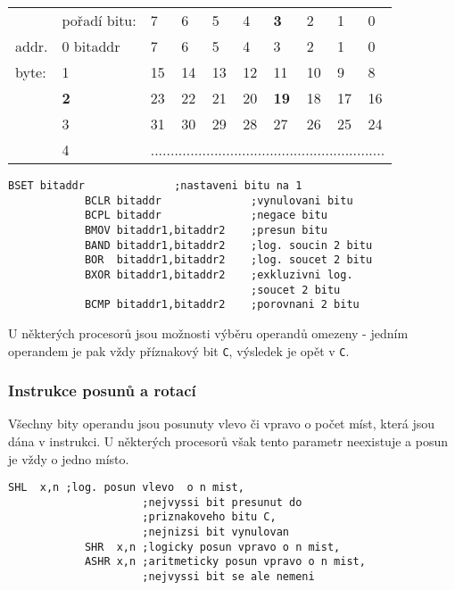           \begin{table}[ht!]
            \begin{tabular*}{0.73\textwidth}{llllllllll}
                          & pořadí bitu: & 7  & 6  & 5  & 4  & \textbf{3}  & 2  & 1  & 0  \\ \cline{1-10}
              addr.       & 0 bitaddr    & 7  & 6  & 5  & 4  & 3           & 2  & 1  & 0  \\
              byte:       & 1            & 15 & 14 & 13 & 12 & 11          & 10 & 9  & 8  \\
                          & \textbf{2}   & 23 & 22 & 21 & 20 & \textbf{19} & 18 & 17 & 16 \\
                          & 3            & 31 & 30 & 29 & 28 & 27          & 26 & 25 & 24 \\
              & 4 & \multicolumn{8}{c}{...........................................................} \\
            \end{tabular*}
            \caption*{ }
          \end{table}

          \begin{lstlisting}[gobble=10]
            BSET bitaddr              ;nastaveni bitu na 1
            BCLR bitaddr              ;vynulovani bitu
            BCPL bitaddr              ;negace bitu
            BMOV bitaddr1,bitaddr2    ;presun bitu
            BAND bitaddr1,bitaddr2    ;log. soucin 2 bitu
            BOR  bitaddr1,bitaddr2    ;log. soucet 2 bitu 
            BXOR bitaddr1,bitaddr2    ;exkluzivni log. 
                                      ;soucet 2 bitu
            BCMP bitaddr1,bitaddr2    ;porovnani 2 bitu
          \end{lstlisting}
          
          U některých procesorů jsou možnosti výběru operandů omezeny - jedním operandem je pak 
          vždy příznakový bit \texttt{C}, výsledek je opět v \texttt{C}.
          
        \subsubsection{Instrukce posunů a rotací}          
          Všechny bity operandu jsou posunuty vlevo či vpravo o počet míst, která jsou dána v 
          instrukci. U některých procesorů však tento parametr neexistuje a posun je vždy o jedno 
          místo.
          \begin{lstlisting}[gobble=10]
            SHL  x,n ;log. posun vlevo  o n mist, 
                     ;nejvyssi bit presunut do
                     ;priznakoveho bitu C, 
                     ;nejnizsi bit vynulovan
            SHR  x,n ;logicky posun vpravo o n mist, 
            ASHR x,n ;aritmeticky posun vpravo o n mist, 
                     ;nejvyssi bit se ale nemeni
          \end{lstlisting}

